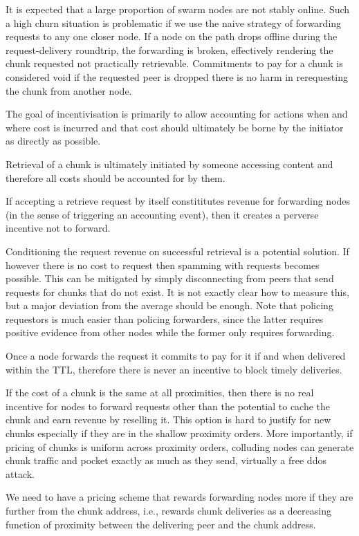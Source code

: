 \documentclass[a4paper,10pt,fullpage]{article}
\numberwithin{equation}{section}
\theoremstyle{definition}
\begin{document}
It is expected that a large proportion of swarm nodes are not stably online. Such a high churn situation is problematic if we use the naive strategy of forwarding requests to any one closer node. If a node on the path drops offline during the request-delivery roundtrip, the forwarding is broken, effectively rendering the chunk requested not practically retrievable. Commitments to pay for a chunk is considered 
void if the requested peer is dropped there is no harm in rerequesting the chunk from another node.

The goal of incentivisation is primarily to allow accounting for actions when and where cost is incurred and that cost should ultimately be borne by the initiator  as directly as possible. 

Retrieval of a chunk is ultimately initiated by someone accessing content and therefore all costs should be accounted for by them.

If accepting a retrieve request by itself constititutes revenue for forwarding nodes (in the sense of triggering an accounting event), then it creates a perverse incentive not to forward. 

Conditioning the request revenue on successful retrieval is a potential solution.
If however there is no cost to request then spamming with requests becomes possible.
This can be mitigated by simply disconnecting from peers that send requests for chunks that do not exist. 
It is not exactly clear how to measure this, but a major deviation from the average should be enough.
Note that policing requestors is much easier than policing forwarders, since the latter requires positive evidence from other nodes while the former only requires forwarding.

Once a node forwards the request it commits to pay for it if and when delivered within the TTL, therefore there is never an incentive to block timely deliveries.

If the cost of a chunk is the same at all proximities, then there is no real incentive for nodes to forward requests other than the potential to cache the chunk and earn revenue by reselling it. This option is hard to justify for new chunks especially if they are in the shallow proximity orders. More importantly, if pricing of chunks is uniform across proximity orders, colluding nodes can generate chunk traffic  and pocket exactly as much as they send, virtually a free ddos attack.

We need to have a pricing scheme that rewards forwarding nodes more if they are further from the chunk address, i.e., rewards chunk deliveries as a decreasing function of proximity between the delivering peer and the chunk address.
\end{document}

